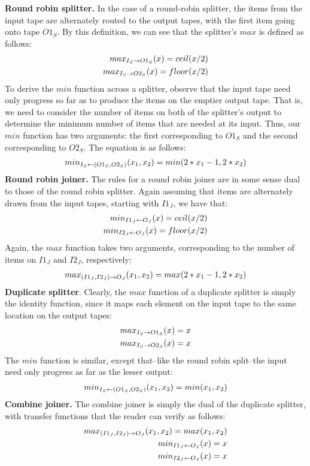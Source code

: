 {\bf Round robin splitter.}  In the case of a round-robin splitter, the
items from the input tape are alternately routed to the output tapes,
with the first item going onto tape $O1_S$.  By this definition, we
can see that the splitter's $max$ is defined as follows:
\begin{eqnarray*}
max_{I_S \rightarrow O1_S}(x) = ceil(x/2) \\
max_{I_S \rightarrow O2_S}(x) = floor(x/2)
\end{eqnarray*}
To derive the $min$ function across a splitter, observe that the input
tape need only progress so far as to produce the items on the emptier
output tape.  That is, we need to consider the number of items on both
of the splitter's output to determine the minimum number of items that
are needed at its input.  Thus, our $min$ function has two arguments:
the first corresponding to $O1_S$ and the second corresponding to
$O2_S$.  The equation is as follows:
\begin{eqnarray*}
min_{I_S \leftarrow (O1_S, O2_S)}(x_1, x_2) = min(2*x_1-1, 2*x_2)
\end{eqnarray*}
{\bf Round robin joiner.}  The rules for a round robin joiner are in
some sense dual to those of the round robin splitter.  Again assuming
that items are alternately drawn from the input tapes, starting with
$I1_J$, we have that:
\begin{eqnarray*}
min_{I1_J \leftarrow O_J}(x) = ceil(x/2) \\
min_{I2_J \leftarrow O_J}(x) = floor(x/2) 
\end{eqnarray*}
Again, the $max$ function takes two arguments, corresponding to the
number of items on $I1_J$ and $I2_J$, respectively:
\begin{eqnarray*}
max_{(I1_J, I2_J) \rightarrow O_J}(x_1, x_2) = max(2*x_1-1, 2*x_2)
\end{eqnarray*}
{\bf Duplicate splitter}.  Clearly, the $max$ function of a duplicate
splitter is simply the identity function, since it maps each element
on the input tape to the same location on the output tapes:
\begin{eqnarray*}
max_{I_S \rightarrow O1_S}(x) = x \\
max_{I_S \rightarrow O2_S}(x) = x
\end{eqnarray*}
The $min$ function is similar, except that--like the round robin
split--the input need only progress as far as the lesser output:
\begin{eqnarray*}
min_{I_S \leftarrow (O1_S, O2_S)}(x_1, x_2) = min(x_1, x_2)
\end{eqnarray*}
{\bf Combine joiner.} The combine joiner is simply the dual of the
duplicate splitter, with transfer functions that the reader can verify
as follows:
\begin{eqnarray*}
max_{(I1_J, I2_J) \rightarrow O_J}(x_1, x_2) = max(x_1, x_2) \\
min_{I1_J \leftarrow O_J}(x) = x \\
min_{I2_J \leftarrow O_J}(x) = x
\end{eqnarray*}

